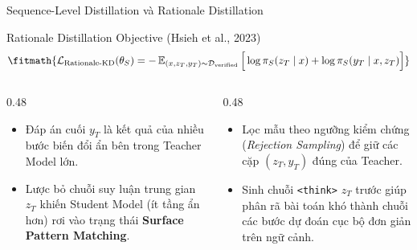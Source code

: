 \begin{frame}{Sequence-Level Distillation và Rationale Distillation}
  \begin{block}{Rationale Distillation Objective (Hsieh et al., 2023)}
    \[
      \fitmath{%
      \mathcal{L}_{\text{Rationale-KD}}(\theta_S) = -\E_{(x, z_T, y_T) \sim \mathcal{D}_{\text{verified}}} \Big[ \log \pi_S(z_T \mid x) + \log \pi_S(y_T \mid x, z_T) \Big]
      }
    \]
  \end{block}

  \begin{columns}[T,onlytextwidth]
    \begin{column}{0.48\textwidth}
      \small
      \begin{itemize}\setlength{\itemsep}{4pt}
        \item Đáp án cuối $y_T$ là kết quả của nhiều bước biến đổi ẩn bên trong Teacher Model lớn.
        \item Lược bỏ chuỗi suy luận trung gian $z_T$ khiến Student Model (ít tầng ẩn hơn) rơi vào trạng thái \textbf{Surface Pattern Matching}.
      \end{itemize}
    \end{column}
    \begin{column}{0.48\textwidth}
      \small
      \begin{itemize}\setlength{\itemsep}{4pt}
        \item Lọc mẫu theo ngưỡng kiểm chứng (\textit{Rejection Sampling}) để giữ các cặp $(z_T, y_T)$ đúng của Teacher.
        \item Sinh chuỗi \texttt{<think>} $z_T$ trước giúp phân rã bài toán khó thành chuỗi các bước dự đoán cục bộ đơn giản trên ngữ cảnh.
      \end{itemize}
    \end{column}
  \end{columns}
  \par\vspace{0pt}
\end{frame}

